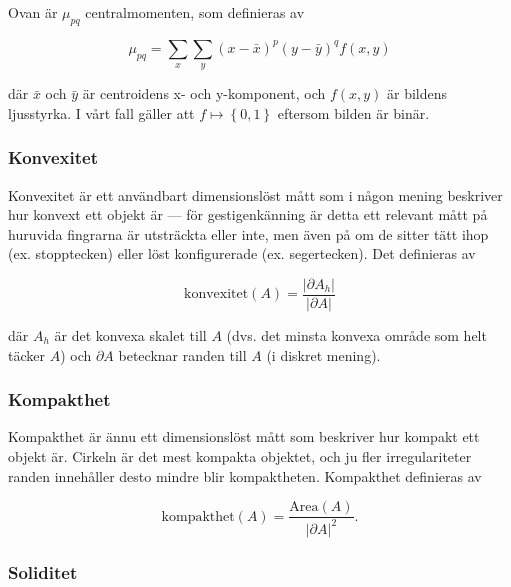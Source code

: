 \documentclass[../rapport_MVEX01-11-05]{subfiles}
\begin{document}
Ovan är $\mu_{pq}$ centralmomenten, som definieras av

\begin{equation*}
	\mu_{pq} = \sum\limits_x\sum\limits_y
	           \left(x-\bar{x}\right)^p
	           \left(y-\bar{y}\right)^q
	           f(x,y)
\end{equation*}

där $\bar{x}$ och $\bar{y}$ är centroidens x- och y-komponent, och $f(x,y)$ är
bildens ljusstyrka. I vårt fall gäller att $f\mapsto\left\{0,1\right\}$
eftersom bilden är binär.

\subsubsection{Konvexitet}

Konvexitet \cite[s.~26]{Rudemo09} är ett användbart dimensionslöst
mått som i någon mening beskriver hur konvext ett objekt är --- för
gestigenkänning är detta ett relevant mått på huruvida fingrarna är
utsträckta eller inte, men även på om de sitter tätt ihop (ex.
stopptecken) eller löst konfigurerade (ex. segertecken). Det
definieras av

\begin{equation*}
  \textrm{konvexitet}(A) = \frac{\left|\partial A_h\right|}{\left|\partial A\right|}
\end{equation*}

där $A_h$ är det konvexa skalet till $A$ (dvs. det minsta konvexa område som
helt täcker $A$) och $\partial A$ betecknar randen till $A$ (i diskret
mening).

\subsubsection{Kompakthet}

Kompakthet \cite[s.~26]{Rudemo09} är ännu ett dimensionslöst mått som
beskriver hur kompakt ett objekt är.
Cirkeln är det mest kompakta objektet, och ju fler irregulariteter
randen innehåller desto mindre blir kompaktheten. Kompakthet
definieras av

\begin{equation*}
  \textrm{kompakthet}(A) = \frac{\textrm{Area}(A)}{\left|\partial
  A\right|^2}.
\end{equation*}

\subsubsection{Soliditet}
\label{feat:soliditet}
\end{document}
